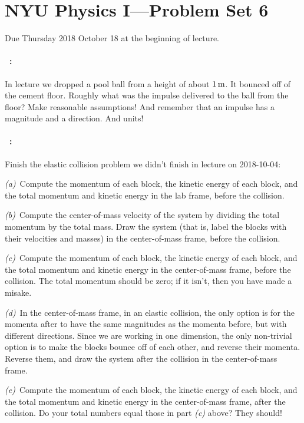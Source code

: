 \documentclass[12pt]{article}
\begin{document}
\section*{NYU Physics I---Problem Set 6}

Due Thursday 2018 October 18 at the beginning of lecture.

\paragraph{\problemname~\theproblem:}%
In lecture we dropped a pool ball from a height of about $1\,\mathrm{m}$. It
bounced off of the cement floor. Roughly what was the impulse
delivered to the ball from the floor? Make reasonable assumptions! And
remember that an impulse has a magnitude and a direction. And units!

\paragraph{\problemname~\theproblem:}\label{elastic}%
Finish the elastic collision problem we didn't finish in lecture on 2018-10-04:

\textsl{(a)}~Compute the momentum of each block, the kinetic energy of
each block, and the total momentum and kinetic energy in the lab
frame, before the collision.

\textsl{(b)}~Compute the center-of-mass velocity of the system by
dividing the total momentum by the total mass. Draw the system (that
is, label the blocks with their velocities and masses) in the
center-of-mass frame, before the collision.

\textsl{(c)}~Compute the momentum of each block, the kinetic energy of
each block, and the total momentum and kinetic energy in the
center-of-mass frame, before the collision. The total momentum should
be zero; if it isn't, then you have made a misake.

\textsl{(d)}~In the center-of-mass frame, in an elastic collision, the
only option is for the momenta after to have the same magnitudes as
the momenta before, but with different directions. Since we are
working in one dimension, the only non-trivial option is to make the
blocks bounce off of each other, and reverse their momenta. Reverse
them, and draw the system after the collision in the center-of-mass
frame.

\textsl{(e)}~Compute the momentum of each block, the kinetic energy of
each block, and the total momentum and kinetic energy in the
center-of-mass frame, after the collision. Do your total numbers equal those
in part \textsl{(c)} above? They should!
\end{document}
